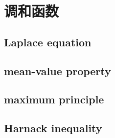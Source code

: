 \section{调和函数}
\label{b3:sec:1501}


\subsection{Laplace equation}
\label{b3:subsec:150101}

\subsection{mean-value property}
\label{b3:subsec:150102}

\subsection{maximum principle}
\label{b3:subsec:150103}

\subsection{Harnack inequality}
\label{b3:subsec:150104}


